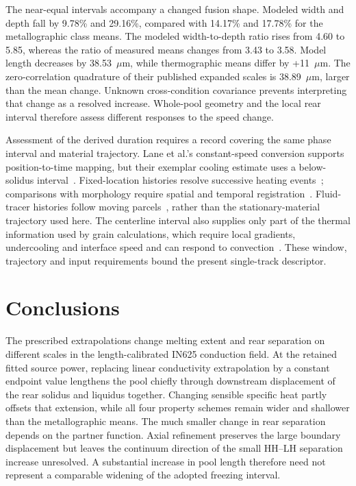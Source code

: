 \documentclass[preprint,12pt]{elsarticle}
\newcommand{\um}{\ensuremath{\mu\mathrm{m}}}
\begin{document}
The near-equal intervals accompany a changed fusion shape. Modeled width and depth fall by 9.78\% and 29.16\%, compared with 14.17\% and 17.78\% for the metallographic class means. The modeled width-to-depth ratio rises from 4.60 to 5.85, whereas the ratio of measured means changes from 3.43 to 3.58. Model length decreases by 38.53~\um{}, while thermographic means differ by +11~\um. The zero-correlation quadrature of their published expanded scales is 38.89~\um{}, larger than the mean change. Unknown cross-condition covariance prevents interpreting that change as a resolved increase. Whole-pool geometry and the local rear interval therefore assess different responses to the speed change.

Assessment of the derived duration requires a record covering the same phase interval and material trajectory. Lane et al.'s constant-speed conversion supports position-to-time mapping, but their exemplar cooling estimate uses a below-solidus interval~\cite{lane2020}. Fixed-location histories resolve successive heating events~\cite{hooper2018}; comparisons with morphology require spatial and temporal registration~\cite{zhang2022registration}. Fluid-tracer histories follow moving parcels~\cite{Hou2024Dissolution}, rather than the stationary-material trajectory used here. The centerline interval also supplies only part of the thermal information used by grain calculations, which require local gradients, undercooling and interface speed and can respond to convection~\cite{yuan2024,xiong2022}. These window, trajectory and input requirements bound the present single-track descriptor.

\section{Conclusions}

The prescribed extrapolations change melting extent and rear separation on different scales in the length-calibrated IN625 conduction field. At the retained fitted source power, replacing linear conductivity extrapolation by a constant endpoint value lengthens the pool chiefly through downstream displacement of the rear solidus and liquidus together. Changing sensible specific heat partly offsets that extension, while all four property schemes remain wider and shallower than the metallographic means. The much smaller change in rear separation depends on the partner function. Axial refinement preserves the large boundary displacement but leaves the continuum direction of the small HH--LH separation increase unresolved. A substantial increase in pool length therefore need not represent a comparable widening of the adopted freezing interval.
\end{document}

